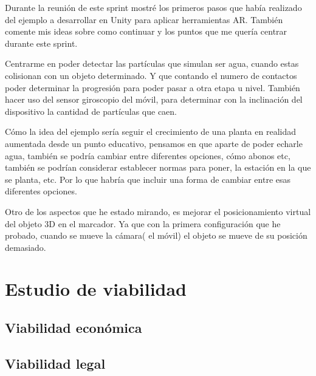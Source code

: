 Durante la reunión de este sprint mostré los primeros pasos que había realizado del ejemplo a desarrollar en Unity para aplicar herramientas AR. También comente mis ideas sobre como continuar y los puntos que me quería centrar durante este sprint.

Centrarme en poder detectar las partículas que simulan ser agua, cuando estas colisionan con un objeto determinado. Y que contando el numero de contactos poder determinar la progresión para poder pasar a otra etapa u nivel. También hacer uso del sensor giroscopio del móvil, para determinar con la inclinación del dispositivo la cantidad de partículas que caen.

Cómo la idea del ejemplo sería seguir el crecimiento de una planta en realidad aumentada desde un punto educativo, pensamos en que aparte de poder echarle agua, también se podría cambiar entre diferentes opciones, cómo abonos etc, también se podrían considerar establecer normas para poner, la estación en la que se planta, etc. Por lo que habría que incluir una forma de cambiar entre esas diferentes opciones.

Otro de los aspectos que he estado mirando, es mejorar el posicionamiento virtual del objeto 3D en el marcador. Ya que con la primera configuración que he probado, cuando se mueve la cámara( el móvil) el objeto se mueve de su posición demasiado.

\section{Estudio de viabilidad}

\subsection{Viabilidad económica}

\subsection{Viabilidad legal}


